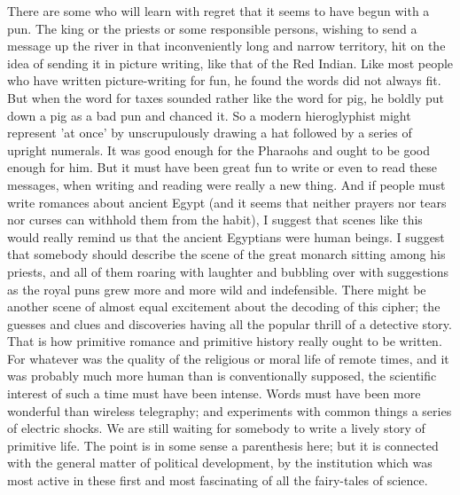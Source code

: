 There are some who will learn with regret that it seems to have begun with a pun. The king or the priests or some responsible persons, wishing to send a message up the river in that inconveniently long and narrow territory, hit on the idea of sending it in picture writing, like that of the Red Indian. Like most people who have written picture-writing for fun, he found the words did not always fit. But when the word for taxes sounded rather like the word for pig, he boldly put down a pig as a bad pun and chanced it. So a modern hieroglyphist might represent 'at once' by unscrupulously drawing a hat followed by a series of upright numerals. It was good enough for the Pharaohs and ought to be good enough for him. But it must have been great fun to write or even to read these messages, when writing and reading were really a new thing. And if people must write romances about ancient Egypt (and it seems that neither prayers nor tears nor curses can withhold them from the habit), I suggest that scenes like this would really remind us that the ancient Egyptians were human beings. I suggest that somebody should describe the scene of the great monarch sitting among his priests, and all of them roaring with laughter and bubbling over with suggestions as the royal puns grew more and more wild and indefensible. There might be another scene of almost equal excitement about the decoding of this cipher; the guesses and clues and discoveries having all the popular thrill of a detective story. That is how primitive romance and primitive history really ought to be written. For whatever was the quality of the religious or moral life of remote times, and it was probably much more human than is conventionally supposed, the scientific interest of such a time must have been intense. Words must have been more wonderful than wireless telegraphy; and experiments with common things a series of electric shocks. We are still waiting for somebody to write a lively story of primitive life. The point is in some sense a parenthesis here; but it is connected with the general matter of political development, by the institution which was most active in these first and most fascinating of all the fairy-tales of science.

